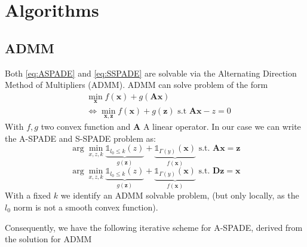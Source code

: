 \documentclass[twocolumn]{scrartcl}
\renewcommand{\vec}[1]{\boldsymbol{#1}}
\begin{document}
\section{Algorithms}
\subsection{ADMM}
Both  \eqref{eq:ASPADE} and  \eqref{eq:SSPADE} are solvable via the Alternating Direction Method of Multipliers (ADMM). ADMM can solve problem of the form
\begin{equation}
  \label{eq:ADMM}
  \begin{aligned}
    &\min_{\vec{x}} f(\vec{x}) + g(\vec{Ax}) \\
    &\iff \min_{\vec{x,z}} f(\vec{x})+g(\vec{z}) \text{ s.t } \vec{Ax}-z = 0
  \end{aligned}
\end{equation}
With \(f,g\)  two convex function and \(\vec{A}\) A linear operator. In our case we can write the A-SPADE and S-SPADE problem as:
\begin{equation}
  \label{eq:2}
  \arg\min_{x,z,k} \underbrace{\mathbb{1}_{l_{0}\le k}(z)}_{g(\vec{z})} + \underbrace{\mathbb{1}_{\Gamma(y)}(\vec{x})}_{f(\vec{x})}  \text{ s.t. } \vec{Ax}=\vec{z}
\end{equation}
\begin{equation}
  \label{eq:2}
  \arg\min_{x,z,k} \underbrace{\mathbb{1}_{l_{0}\le k}(z)}_{g(\vec{z})} + \underbrace{\mathbb{1}_{\Gamma(y)}(\vec{x})}_{f(\vec{x})}  \text{ s.t. } \vec{Dz}=\vec{x}
\end{equation}
With a fixed \(k\)  we identify an ADMM solvable problem, (but only locally, as the \(l_{0}\) norm is not a smooth convex function).

Consequently, we have the following iterative scheme for A-SPADE, derived from the solution for ADMM \cite{zaviska_s-spade_2020}
\end{document}
